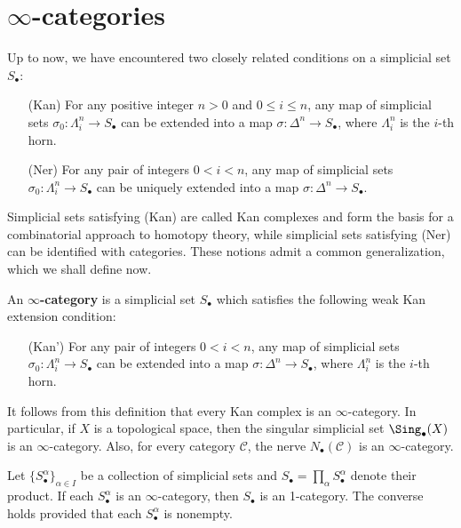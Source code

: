 \section{\boldmath\texorpdfstring{$\infty$}{inf}-categories}
Up to now, we have encountered two closely related conditions on a simplicial set $S_\bullet$:
\begin{enumerate}[leftmargin=40pt]
\item[(Kan)] For any positive integer $n>0$ and $0\leq i\leq n$, any map of simplicial sets $\sigma_0:\Lambda^n_i\to S_\bullet$ can be extended into a map $\sigma:\Delta^n\to S_\bullet$, where $\Lambda^n_i$ is the $i$-th horn.
\item[(Ner)] For any pair of integers $0<i<n$, any map of simplicial sets $\sigma_0:\Lambda_i^n\to S_\bullet$ can be uniquely extended into a map $\sigma:\Delta^n\to S_\bullet$.
\end{enumerate}
Simplicial sets satisfying (Kan) are called Kan complexes and form the basis for a combinatorial approach to homotopy theory, while simplicial sets satisfying (Ner) can be identified with categories. These notions admit a common generalization, which we shall define now.\par
An \textbf{$\infty$-category} is a simplicial set $S_\bullet$ which satisfies the following weak Kan extension condition:
\begin{enumerate}[leftmargin=40pt]
\item[(Kan')] For any pair of integers $0<i<n$, any map of simplicial sets $\sigma_0:\Lambda^n_i\to S_\bullet$ can be extended into a map $\sigma:\Delta^n\to S_\bullet$, where $\Lambda^n_i$ is the $i$-th horn.
\end{enumerate}
It follows from this definition that every Kan complex is an $\infty$-category. In particular, if $X$ is a topological space, then the singular simplicial set $\Sing_\bullet(X)$ is an $\infty$-category. Also, for every category $\mathcal{C}$, the nerve $N_\bullet(\mathcal{C})$ is an $\infty$-category. 
\begin{example}\label{simplicial set product of inf-cat}
Let $\{S_\bullet^\alpha\}_{\alpha\in I}$ be a collection of simplicial sets and $S_\bullet=\prod_{\alpha}S_\bullet^\alpha$ denote their product. If each $S_\bullet^\alpha$ is an $\infty$-category, then $S_\bullet$ is an 1-category. The converse holds provided that each $S_\bullet^\alpha$ is nonempty.
\end{example}
